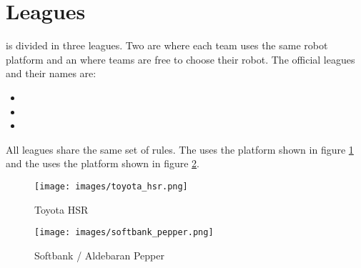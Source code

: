 \section{Leagues}
\label{sec:introduction:leagues}

\AtHome{} is divided in three leagues. Two are \SPLs{} where each team uses the same robot platform and an \OPL{} where teams are free to choose their robot. The official leagues and their names are:
\begin{itemize}
  \item \DSPL{}
  \item \SSPL{}
  \item \OPL{}
\end{itemize}

\noindent All leagues share the same set of rules. The \DSPL{} uses the \HSR{} platform shown in figure \ref{fig:toyotaHSR} and the \SSPL{} uses the \PEPPER{} platform shown in figure \ref{fig:softbank-pepper}.

\begin{minipage}{0.5\textwidth}
	\begin{figure}[H]
		\begin{center}
			\texttt{[image: images/toyota\_hsr.png]}
			\caption{Toyota HSR}
			\label{fig:toyotaHSR}
		\end{center}
	\end{figure}
\end{minipage}
\begin{minipage}{0.5\textwidth}
	\begin{figure}[H]
		\begin{center}
			\texttt{[image: images/softbank\_pepper.png]}
			\caption{Softbank / Aldebaran Pepper}
			\label{fig:softbank-pepper}
		\end{center}
	\end{figure}
\end{minipage}